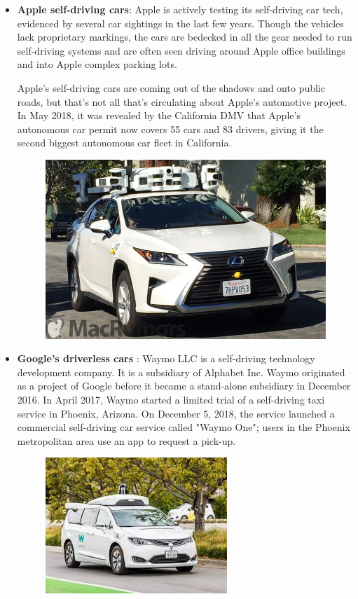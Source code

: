 \begin{itemize}
 \item\textbf{Apple self-driving cars}: Apple is actively testing its self-driving car tech, evidenced by several car sightings in the last few years. Though the vehicles lack proprietary markings, the cars are bedecked in all the gear needed to run self-driving systems and are often seen driving around Apple office buildings and into Apple complex parking lots. 
\par
Apple's self-driving cars are coming out of the shadows and onto public roads, but that's not all that's circulating about Apple's automotive project.
In May 2018, it was revealed by the California DMV that Apple's autonomous car permit now covers 55 cars and 83 drivers, giving it the second biggest autonomous car fleet in California.\cite{web029}
\begin{figure}[H]%
    \center%
    \includegraphics[width=.5\textwidth]{images/Alaa/apple.jpg}%
  \end{figure}
  
\item\textbf{Google's driverless cars }:
Waymo LLC is a self-driving technology development company. It is a subsidiary of Alphabet Inc. Waymo originated as a project of Google before it became a stand-alone subsidiary in December 2016. In April 2017, Waymo started a limited trial of a self-driving taxi service in Phoenix, Arizona. On December 5, 2018, the service launched a commercial self-driving car service called "Waymo One"; users in the Phoenix metropolitan area use an app to request a pick-up.\cite{web030}
\begin{figure}[H]%
    \center%
    \includegraphics[width=.5\textwidth]{images/Alaa/waymo.jpg}%
  \end{figure}
  

\end{itemize}
